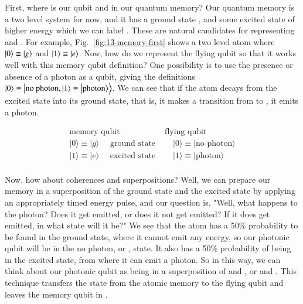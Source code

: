 First, where is our qubit  and  in our quantum memory? Our quantum memory is a two level system for now, and it has a ground state , and some excited state of higher energy which we can label . These are natural candidates for representing  and . For example, Fig.~\ref{fig:13-memory-first} shows a two level atom where $\left| 0 \right\rangle\equiv\left| g \right\rangle$ and $\left| 1 \right\rangle\equiv\left| e \right\rangle$. Now, how do we represent the flying qubit so that it works well with this memory qubit definition? One possibility is to use the presence or absence of a photon as a qubit, giving the definitions $\left| 0 \right\rangle\equiv\left| \textrm{no photon},\left| 1 \right\rangle\equiv\left| \textrm{photon} \right\rangle \right\rangle$.
We can see that if the atom decays from the excited state into its ground state, that is, it makes a transition from  to , it emits a photon.

\begin{equation}
\begin{array}{ll}
\text{memory qubit} & \text{flying qubit} \\

|0\rangle \equiv|g\rangle \quad \text { ground state } & \quad|0\rangle \equiv \mid \text {no photon}\rangle \\
|1\rangle \equiv|e\rangle \quad \text { excited state } & \quad|1\rangle \equiv \mid \text {photon}\rangle \\
\end{array}
\end{equation}

Now, how about coherences and superpositions? Well, we can prepare our memory in a superposition of the ground state and the excited state by applying an appropriately timed energy pulse, and our question is, "Well, what happens to the photon? Does it get emitted, or does it not get emitted? If it does get emitted, in what state will it be?" We see that the atom has a 50\% probability to be found in the ground state, where it cannot emit any energy, so our photonic qubit will be in the no photon, or , state. It also has a 50\% probability of being in the excited state, from where it can emit a photon. So in this way, we can think about our photonic qubit as being in a superposition of  and , or  and .
This technique transfers the state \ket{+} from the atomic memory to the flying qubit and leaves the memory qubit in . 

